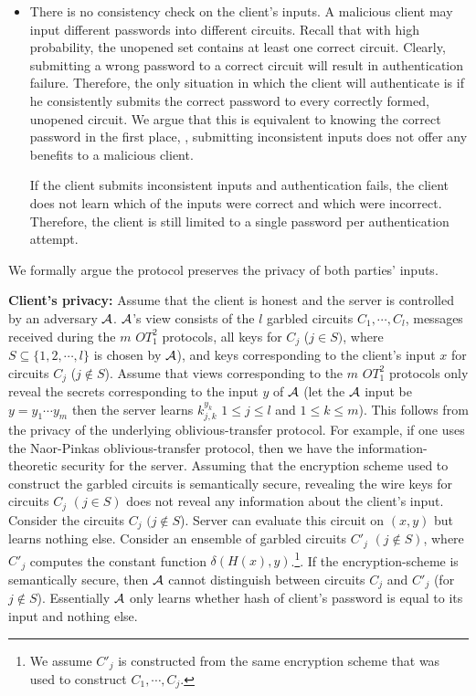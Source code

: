 \begin{itemize}
\item
There is no consistency check on the client's inputs.  A malicious client
may input different passwords into different circuits.  Recall that with
high probability, the unopened set contains at least one correct circuit.
Clearly, submitting a wrong password to a correct circuit will result
in authentication failure.  Therefore, the only situation in which
the client will authenticate is if he consistently submits the correct
password to every correctly formed, unopened circuit.  We argue that
this is equivalent to knowing the correct password in the first place,
\ie, submitting inconsistent inputs does not offer any benefits to a
malicious client.

If the client submits inconsistent inputs and authentication fails,
the client does not learn which of the inputs were correct and which
were incorrect.  Therefore, the client is still limited to a single
password per authentication attempt.

\end{itemize}

We formally argue the protocol preserves the privacy of both parties'
inputs.

\noindent
{\bf Client's privacy:} Assume that the client is honest and the
server is controlled by an adversary ${\cal A}$.  ${\cal A}$'s view
consists of the $l$ garbled circuits $C_1,\cdots,C_l$, messages
received during the $m$ $OT_1^2$ protocols, all keys for $C_j$ ($j \in
S )$, where $S \subseteq \{ 1,2, \cdots, l \}$ is chosen by ${\cal
A}$), and keys corresponding to the client's input $x$ for circuits
$C_j$ ($j \not\in S$). Assume that views corresponding to the $m$
$OT_1^2$ protocols only reveal the secrets corresponding to the input
$y$ of ${\cal A}$ (let the ${\cal A}$ input be $y = y_1 \cdots y_m$
then the server learns $k^{y_k}_{j,k}$ $1 \leq j \leq l$ and $1 \leq k
\leq m$). This follows from the privacy of the underlying
oblivious-transfer protocol. For example, if one uses the Naor-Pinkas
oblivious-transfer protocol, then we have the information-theoretic security
for the server. Assuming that the encryption scheme used
to construct the garbled circuits is semantically secure, revealing
the wire keys for circuits $C_j$ $(j \in S)$ does not reveal any
information about the client's input. Consider the circuits $C_j$ $(j
\not\in S$). Server can evaluate this circuit on $(x,y)$ but learns
nothing else. Consider an ensemble of garbled circuits $C'_j$ $(j
\not\in S)$, 
where $C'_j$ computes the constant function $\delta (H(x),y)$.\footnote{ We assume $C'_j$ is constructed from the same
encryption scheme that was used to construct $C_1,\cdots,C_j$.}. If
the encryption-scheme is semantically secure, then ${\cal A}$ cannot
distinguish between circuits $C_j$ and $C'_j$ (for $j \not\in
S$). Essentially ${\cal A}$ only learns whether hash of client's
password is equal to its input and nothing else.

